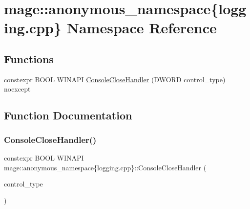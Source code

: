 \hypertarget{namespacemage_1_1anonymous__namespace_02logging_8cpp_03}{}\section{mage\+:\+:anonymous\+\_\+namespace\{logging.\+cpp\} Namespace Reference}
\label{namespacemage_1_1anonymous__namespace_02logging_8cpp_03}
\subsection*{Functions}
\begin{DoxyCompactItemize}
\item 
constexpr B\+O\+OL W\+I\+N\+A\+PI \mbox{\hyperlink{namespacemage_1_1anonymous__namespace_02logging_8cpp_03_a667461db0e361d951ac404b12e7583d1}{Console\+Close\+Handler}} (D\+W\+O\+RD control\+\_\+type) noexcept
\end{DoxyCompactItemize}


\subsection{Function Documentation}
\mbox{\label{namespacemage_1_1anonymous__namespace_02logging_8cpp_03_a667461db0e361d951ac404b12e7583d1}} 
\subsubsection{\texorpdfstring{Console\+Close\+Handler()}{ConsoleCloseHandler()}}
{\footnotesize\ttfamily constexpr B\+O\+OL W\+I\+N\+A\+PI mage\+::anonymous\+\_\+namespace\{logging.\+cpp\}\+::Console\+Close\+Handler (\begin{DoxyParamCaption}\item[{D\+W\+O\+RD}]{control\+\_\+type }\end{DoxyParamCaption})\hspace{0.3cm}{\ttfamily [noexcept]}}

